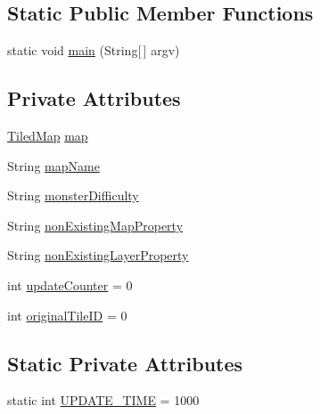 \subsection*{Static Public Member Functions}
\begin{DoxyCompactItemize}
\item 
static void \mbox{\hyperlink{classorg_1_1newdawn_1_1slick_1_1tests_1_1_tile_map_test_a25f6f4309da85ca23aa292e757e586f9}{main}} (String\mbox{[}$\,$\mbox{]} argv)
\end{DoxyCompactItemize}
\subsection*{Private Attributes}
\begin{DoxyCompactItemize}
\item 
\mbox{\hyperlink{classorg_1_1newdawn_1_1slick_1_1tiled_1_1_tiled_map}{Tiled\+Map}} \mbox{\hyperlink{classorg_1_1newdawn_1_1slick_1_1tests_1_1_tile_map_test_a9556866283ab0588cbdf6c5b52c20a27}{map}}
\item 
String \mbox{\hyperlink{classorg_1_1newdawn_1_1slick_1_1tests_1_1_tile_map_test_aea368a6a5d3db9b818166ed67000bc76}{map\+Name}}
\item 
String \mbox{\hyperlink{classorg_1_1newdawn_1_1slick_1_1tests_1_1_tile_map_test_ae6006a02123c6cb2a3f90ffc723087c7}{monster\+Difficulty}}
\item 
String \mbox{\hyperlink{classorg_1_1newdawn_1_1slick_1_1tests_1_1_tile_map_test_aa74d0924f7116aa7b47afad19fa79eb8}{non\+Existing\+Map\+Property}}
\item 
String \mbox{\hyperlink{classorg_1_1newdawn_1_1slick_1_1tests_1_1_tile_map_test_aa73bda53fe33e9b901e147425469cfc6}{non\+Existing\+Layer\+Property}}
\item 
int \mbox{\hyperlink{classorg_1_1newdawn_1_1slick_1_1tests_1_1_tile_map_test_a5d54975b114165ee5d6661153ab60842}{update\+Counter}} = 0
\item 
int \mbox{\hyperlink{classorg_1_1newdawn_1_1slick_1_1tests_1_1_tile_map_test_a533aa2f1746bfedb4ab9bbc496708e5f}{original\+Tile\+ID}} = 0
\end{DoxyCompactItemize}
\subsection*{Static Private Attributes}
\begin{DoxyCompactItemize}
\item 
static int \mbox{\hyperlink{classorg_1_1newdawn_1_1slick_1_1tests_1_1_tile_map_test_ab59c566c99bd22cb7f7769301a14b70b}{U\+P\+D\+A\+T\+E\+\_\+\+T\+I\+ME}} = 1000
\end{DoxyCompactItemize}
